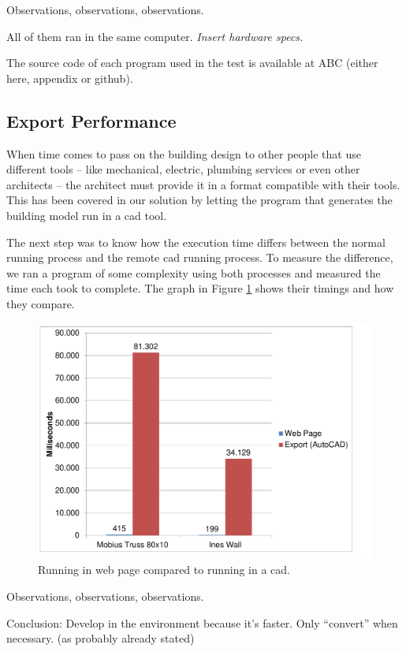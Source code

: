 Observations, observations, observations.

All of them ran in the same computer.
{\it Insert hardware specs.}

The source code of each program used in the test is available at ABC (either here, appendix or github).


\subsection{Export Performance}
When time comes to pass on the building design to other people that use different tools -- like mechanical, electric, plumbing services or even other architects -- the architect must provide it in a format compatible with their tools.
This has been covered in our solution by letting the program that generates the building model run in a \gls{cad} tool.

The next step was to know how the execution time differs between the normal running process and the remote \gls{cad} running process.
To measure the difference, we ran a program of some complexity using both processes and measured the time each took to complete.
The graph in Figure \ref{fig:local:remote:timing} shows their timings and how they compare.

\begin{figure}
  \centering
  \includegraphics[width=12cm]{./images/local_remote_timing}
  \caption{Running in web page compared to running in a \gls{cad}.}
  \label{fig:local:remote:timing}
\end{figure}

Observations, observations, observations.

Conclusion: Develop in the environment because it's faster. Only ``convert'' when necessary. (as probably already stated)


